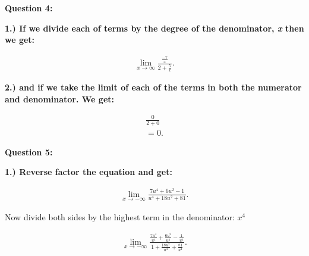 \documentclass{report}
\begin{document}
    \bigbreak \noindent \bigbreak \noindent 
    \bigbreak \noindent 

    \bigbreak \noindent \bigbreak \noindent  
    \begin{Large}
        \noindent \textbf{Question 4:}
    \end{Large}

    \bigbreak \noindent \bigbreak \noindent 
    \bigbreak \noindent 
    \textbf{1.) If we divide each of terms by the degree of the denominator, \textbf{\textit{x}}
        then we get:
    }

    \begin{align*}
        \lim\limits_{x \to \infty}{ \frac{ \frac{-7}{x}}{2 + \frac{5}{x}}}
    .\end{align*}

    \bigbreak \noindent 
    \textbf{2.) and if we take the limit of each of the terms in both the numerator and denominator. We get:}

    \begin{align*}
        \frac{0}{2+0} \\
        = 0
    .\end{align*}

    \bigbreak \noindent 

    \bigbreak \noindent \bigbreak \noindent 
    \begin{Large}
        \textbf{Question 5:}
    \end{Large}

    \bigbreak \noindent  \bigbreak \noindent 
    \bigbreak \noindent 
    \textbf{1.) Reverse factor the equation and get:}

    \begin{align*}
        \lim\limits_{x \to - \infty}{ \frac{7u^4 + 6u^2 - 1}{u^4 + 18u^2 + 81}}
    .\end{align*}

    \bigbreak \noindent 
    Now divide both sides by the highest term in the denominator: \textbf{\textit{$x^4$}}

    \begin{align*}
        \lim\limits_{x \to - \infty}{ \frac{ \frac{7u^4}{u^4} + \frac{6u^2}{u^4} - \frac{1}{u^4}}{1 + \frac{18u^2}{u^4} + \frac{81}{u^4}}}
    .\end{align*}
\end{document}
